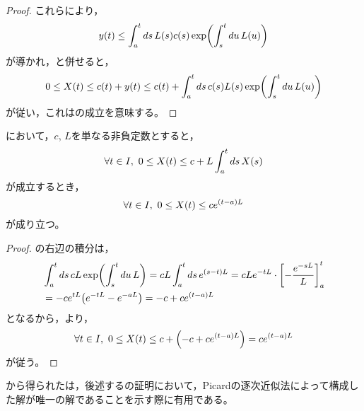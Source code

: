 \documentclass[b5paper,draft,oneside,openany]{ltjsbook} %
\begin{document}
\begin{thm}
\begin{proof}
        これらにより，
        \begin{equation}
            \fun{y}{t}\leq \int_a^t ds\, \fun{L}{s}\fun{c}{s}\fun{\exp}{\int_s^t du\, \fun{L}{u}}
        \end{equation}
        が導かれ，と併せると，
        \begin{equation}
            0\leq \fun{X}{t}\leq \fun{c}{t}+\fun{y}{t}\leq \fun{c}{t}+\int_a^t ds\, \fun{c}{s}\fun{L}{s}\fun{\exp}{\int_s^t du\, \fun{L}{u}}
        \end{equation}
        が従い，これはの成立を意味する。
    \end{proof}
\end{thm}

\begin{cor}
    において，$c$, $L$を単なる非負定数とすると，
    \begin{equation}
        \forall t\in I,\ 0\leq \fun{X}{t}\leq c+L\int_a^t ds\, \fun{X}{s}
    \end{equation}
    が成立するとき，
    \begin{equation}
        \forall t\in I,\ 0\leq \fun{X}{t}\leq ce^{\pare{t-a}L}
    \end{equation}
    が成り立つ。
    \begin{proof}
        の右辺の積分は，
        \begin{align}
            &\int_a^t ds\, cL\fun{\exp}{\int_s^t du\, L}
            =cL\int_a^t ds\, e^{\pare{s-t}L}
            =cLe^{-tL}\cdot\squ{-\frac{e^{-sL}}{L}}_a^t
            \\
            &=-ce^{tL}\pare{e^{-tL}-e^{-aL}}
            =-c + ce^{\pare{t-a}L}
        \end{align}
        となるから，より，
        \begin{equation}
            \forall t\in I,\
            0\leq \fun{X}{t}\leq c + \pare{-c + ce^{\pare{t-a}L}} = ce^{\pare{t-a}L}
        \end{equation}
        が従う。
    \end{proof}
\end{cor}

から得られたは，後述するの証明において，Picardの逐次近似法によって構成した解が唯一の解であることを示す際に有用である。
\end{document}
